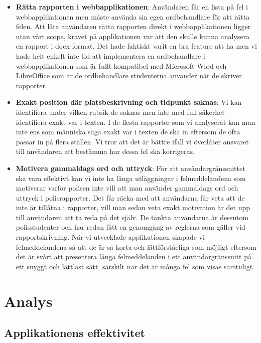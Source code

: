 \documentclass[swedish]{maucsthesis}
\begin{document}
\begin{itemize}
\item \textbf{Rätta rapporten i webbapplikationen}: Användaren får en lista på
  fel i webbapplikationen men måste använda sin egen ordbehandlare för att rätta
  felen. Att låta användaren rätta rapporten direkt i webbapplikationen ligger
  utan vårt scope, kravet på applikationen var att den skulle kunna analysera en
  rapport i docx-format. Det hade faktiskt varit en bra feature att ha men vi
  hade helt enkelt inte tid att implementera en ordbehandlare i
  webbapplikationen som är fullt kompatibel med Microsoft Word och LibreOffice som
  är de ordbehandlare studenterna använder när de skriver rapporter.
\item \textbf{Exakt position där platsbeskrivning och tidpunkt saknas}: Vi kan
  identifiera under vilken rubrik de saknas men inte med full säkerhet
  identifiera exakt var i texten. I de flesta rapporter som vi analyserat kan
  man inte ens som människa säga exakt var i texten de ska in eftersom de
  ofta passar in på flera ställen. Vi tror att det är bättre ifall vi överlåter
  ansvaret till användaren att bestämma hur dessa fel ska korrigeras.
\item \textbf{Motivera gammaldags ord och uttryck}: För att användargränssnittet
  ska vara effektivt kan vi inte ha långa utläggningar i felmeddelandena som
  motiverar varför polisen inte vill att man använder gammaldags ord och uttryck
  i polisrapporter. Det får räcka med att användarna får veta att de inte är
  tillåtna i rapporter, vill man sedan veta exakt motivation är det upp till
  användaren att ta reda på det själv. De tänkta användarna är dessutom
  polisstudenter och har redan fått en genomgång av reglerna som gäller vid
  rapportskrivning. När vi utvecklade applikationen skapade vi felmeddelandena
  så att de är så korta och lättförståeliga som möjligt eftersom det är svårt
  att presentera långa felmeddelanden i ett användargränssnitt på ett snyggt och
  lättläst sätt, särskilt när det är många fel som visas samtidigt.
\end{itemize}

\section{Analys}

\subsection{Applikationens effektivitet}
\end{document}

